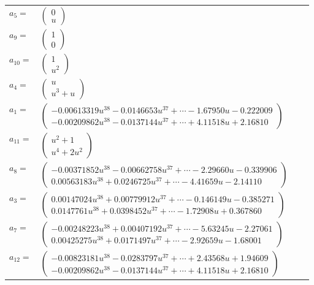 \documentclass[1p]{elsarticle_modified}
\theoremstyle{definition}
\begin{document}
\begin{tabular}{m{7pt} m{180pt} m{7pt} m{180pt} }
\flushright $a_{5}=$&$\begin{pmatrix}0\\u\end{pmatrix}$ \\
\flushright $a_{9}=$&$\begin{pmatrix}1\\0\end{pmatrix}$ \\
\flushright $a_{10}=$&$\begin{pmatrix}1\\u^2\end{pmatrix}$ \\
\flushright $a_{4}=$&$\begin{pmatrix}u\\u^3+u\end{pmatrix}$ \\
\flushright $a_{1}=$&$\begin{pmatrix}-0.00613319 u^{38}-0.0146653 u^{37}+\cdots-1.67950 u-0.222009\\-0.00209862 u^{38}-0.0137144 u^{37}+\cdots+4.11518 u+2.16810\end{pmatrix}$ \\
\flushright $a_{11}=$&$\begin{pmatrix}u^2+1\\u^4+2 u^2\end{pmatrix}$ \\
\flushright $a_{8}=$&$\begin{pmatrix}-0.00371852 u^{38}-0.00662758 u^{37}+\cdots-2.29660 u-0.339906\\0.00563183 u^{38}+0.0246725 u^{37}+\cdots-4.41659 u-2.14110\end{pmatrix}$ \\
\flushright $a_{3}=$&$\begin{pmatrix}0.00147024 u^{38}+0.00779912 u^{37}+\cdots-0.146149 u-0.385271\\0.0147761 u^{38}+0.0398452 u^{37}+\cdots-1.72908 u+0.367860\end{pmatrix}$ \\
\flushright $a_{7}=$&$\begin{pmatrix}-0.00248223 u^{38}+0.00407192 u^{37}+\cdots-5.63245 u-2.27061\\0.00425275 u^{38}+0.0171497 u^{37}+\cdots-2.92659 u-1.68001\end{pmatrix}$ \\
\flushright $a_{12}=$&$\begin{pmatrix}-0.00823181 u^{38}-0.0283797 u^{37}+\cdots+2.43568 u+1.94609\\-0.00209862 u^{38}-0.0137144 u^{37}+\cdots+4.11518 u+2.16810\end{pmatrix}$ \\

\end{tabular}
\end{document}
